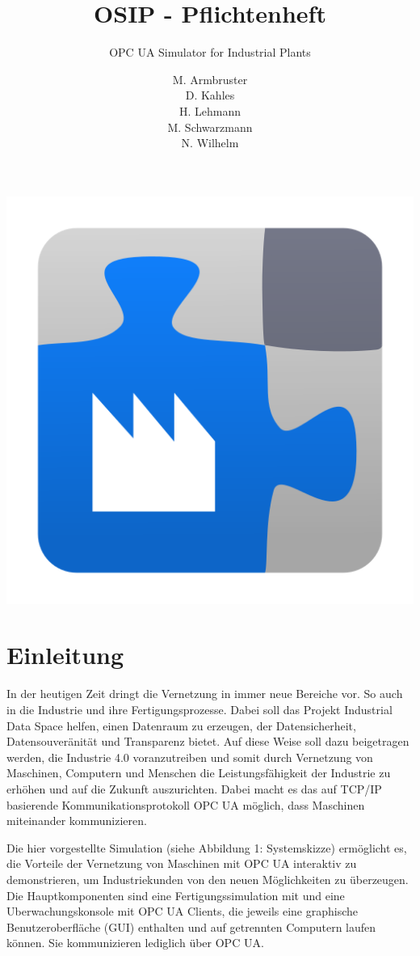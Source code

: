 \documentclass[parskip=full]{scrartcl}
\title{OSIP - Pflichtenheft}
\subtitle{\gls{OPC UA} Simulator for Industrial Plants}
\author{
    M. Armbruster\\
    D. Kahles\\
    H. Lehmann\\
    M. Schwarzmann\\
    N. Wilhelm
}
\begin{document}
\maketitle

\vspace{20px}
\begin{center}
  \includegraphics[scale=0.4]{../icon.png}
\end{center}
\pagebreak
\tableofcontents
\pagebreak

\section{Einleitung}
In der heutigen Zeit dringt die Vernetzung in immer neue Bereiche vor. So auch in die Industrie und ihre Fertigungsprozesse.
Dabei soll das Projekt \gls{Industrial Data Space} helfen, einen Datenraum zu erzeugen, der Datensicherheit, Datensouveränität und
Transparenz bietet. Auf diese Weise soll dazu beigetragen werden, die Industrie 4.0 voranzutreiben und somit durch Vernetzung von
Maschinen, Computern und Menschen die Leistungsfähigkeit der Industrie zu erhöhen und auf die Zukunft auszurichten.
Dabei macht es das auf \gls{TCP/IP} basierende Kommunikationsprotokoll \gls{OPC UA} möglich, dass Maschinen miteinander kommunizieren.

Die hier vorgestellte Simulation (siehe Abbildung 1: Systemskizze) ermöglicht es, die Vorteile der Vernetzung von Maschinen mit \gls{OPC UA} interaktiv
zu demonstrieren, um Industriekunden von den neuen Möglichkeiten zu überzeugen. Die Hauptkomponenten sind eine \gls{Fertigungssimulation}
mit  und eine \gls{Uberwachungskonsole} mit \glspl{OPC UA Client}, die jeweils eine graphische
Benutzeroberfläche (\gls{GUI}) enthalten und auf getrennten Computern laufen können. Sie kommunizieren lediglich über \gls{OPC UA}.
\end{document}
